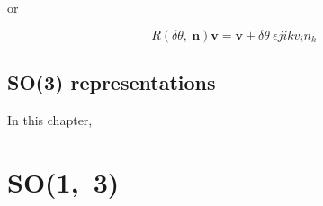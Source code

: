     or 

    \begin{equation*}
        R(\delta \theta, ~ \mathbf n) \mathbf v = \mathbf v + \delta \theta ~ \epsilon{jik} v_i n_k 
    \end{equation*}


\section{SO(3) representations}

    In this chapter, 

\chapter{SO(1,~3)}

